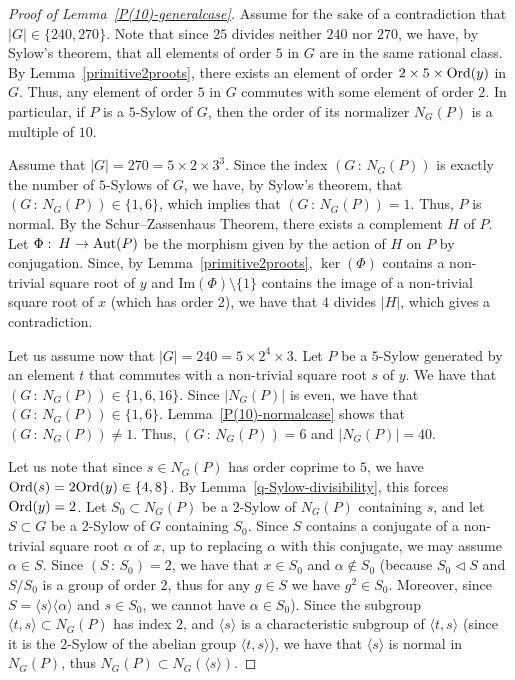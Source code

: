 \documentclass[12pt]{amsart}
\numberwithin{equation}{section}
\newcommand{\Ord}{{\rm Ord}}
\newcommand{\Aut}{{\rm Aut}}
\theoremstyle{definition}
\theoremstyle{remark}
\begin{document}
\begin{proof}[Proof of Lemma~\ref{P(10)-generalcase}]
    Assume for the sake of a contradiction that $|G|\in \{240, 270\}$. Note that since $25$ divides neither $240$ nor $270$, we have, by Sylow's theorem, that all elements of order $5$ in $G$ are in the same rational class. By Lemma~\ref{primitive2proots}, there exists an element of order $2\times 5\times \Ord(y)$ in $G$. Thus, any element of order $5$ in $G$ commutes with some element of order $2$. In particular, if $P$ is a $5$-Sylow of $G$, then the order of its normalizer $N_G(P)$ is a multiple of $10$.
        
    Assume that $|G|=270=5\times 2\times 3^3$. Since the index $(G\, \colon\, N_G(P))$ is exactly the number of $5$-Sylows of $G$, we have, by Sylow's theorem, that $(G\, \colon\,  N_G(P))\in\{1,6\} $, which implies that $(G\, \colon\,  N_G(P))=1$. Thus, $P$ is normal. By the Schur--Zassenhaus Theorem, there exists a complement $H$ of $P$. Let $\Phi\, \colon\, H\to \Aut(P)$ be the morphism given by the action of $H$ on $P$ by conjugation. Since, by Lemma~\ref{primitive2proots}, $\ker(\Phi)$ contains a non-trivial square root of $y$ and $\mathrm{Im}(\Phi)\setminus\{1\}$ contains the image of a non-trivial square root of $x$ (which has order $2$), we have that $4$ divides $|H|$, which gives a contradiction. 
        
    Let us assume now that $|G|=240=5\times 2^4\times 3$. Let $P$ be a $5$-Sylow generated by an element $t$ that commutes with a non-trivial square root $s$ of $y$. We have that $(G\, \colon\,  N_G(P))\in\{1,6, 16\}$. Since $|N_G(P)|$ is even, we have that $(G\, \colon\,  N_G(P))\in \{1,6\}$. Lemma~\ref{P(10)-normalcase} shows that $(G\, \colon\,  N_G(P))\ne 1$. Thus, $(G\, \colon\,N_G(P))=6$ and $|N_G(P)|=40$. 
        
    Let us note that since $s\in N_G(P)$ has order coprime to $5$, we have $\Ord(s)=2\Ord(y)\in\{4,8\}$. By Lemma~\ref{q-Sylow-divisibility}, this forces $\Ord(y)=2$. Let $S_0\subset N_G(P)$ be a $2$-Sylow of $N_G(P)$ containing $s$, and let $S\subset G$ be a $2$-Sylow of $G$ containing $S_0$. Since $S$ contains a conjugate of a non-trivial square root $\alpha$ of $x$, up to replacing $\alpha$ with this conjugate, we may assume $\alpha\in S$. Since $(S\, \colon\,  S_0)=2$, we have that $x\in S_0$ and $\alpha\notin S_0$ (because $S_0\lhd S$ and $S/S_0$ is a group of order $2$, thus for any $g\in S$ we have $g^2\in S_0$. Moreover, since $S=\langle s\rangle\langle \alpha \rangle$ and $s\in S_0$, we cannot have $\alpha \in S_0$). Since the subgroup $\langle t,s\rangle\subset N_G(P)$ has index $2$, and $\langle s\rangle $ is a characteristic subgroup of $\langle t,s\rangle$ (since it is the $2$-Sylow of the abelian group $\langle t,s\rangle$), we have that $\langle s\rangle$ is normal in $N_G(P)$, thus $N_G(P)\subset N_G(\langle s\rangle)$. 
        

\end{proof}
\end{document}
